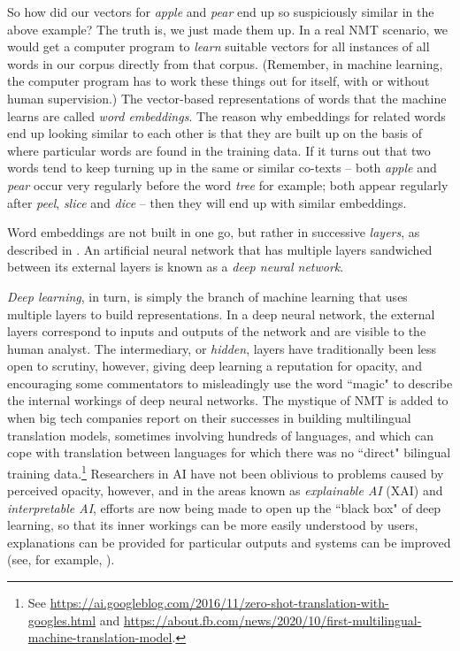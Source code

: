 \documentclass[output=paper]{langscibook}
\begin{document}
So how did our vectors for \textit{apple} and \textit{pear} end up so suspiciously similar in the above example? The truth is, we just made them up. In a real NMT scenario, we would get a computer program to \textit{learn} suitable vectors for all instances of all words in our corpus directly from that corpus. (Remember, in machine learning, the computer program has to work these things out for itself, with or without human supervision.) The vector-based representations of words that the machine learns are called \textit{word embeddings}. The reason why embeddings for related words end up looking similar to each other is that they are built up on the basis of where particular words are found in the training data. If it turns out that two words tend to keep turning up in the same or similar co-texts -- both \textit{apple} and \textit{pear} occur very regularly before the word \textit{tree} for example; both appear regularly after \textit{peel}, \textit{slice} and \textit{dice} -- then they will end up with similar embeddings. 

Word embeddings are not built in one go, but rather in successive \textit{layers}, as described in . An artificial neural network that has multiple layers sandwiched between its external layers is known as a \textit{deep neural network}.

\textit{Deep learning}, in turn, is simply the branch of machine learning that uses multiple layers to build representations. In a deep neural network, the external layers correspond to inputs and outputs of the network and are visible to the human analyst. The intermediary, or \textit{hidden}, layers have traditionally been less open to scrutiny, however, giving deep learning a reputation for opacity, and encouraging some commentators to misleadingly use the word “magic" to describe the internal workings of deep neural networks. The mystique of NMT is added to when big tech companies report on their successes in building multilingual translation models, sometimes involving hundreds of languages, and which can cope with translation between languages for which there was no “direct" bilingual training data.\footnote{See \url{https://ai.googleblog.com/2016/11/zero-shot-translation-with-googles.html} and \url{https://about.fb.com/news/2020/10/first-multilingual-machine-translation-model}.} Researchers in AI have not been oblivious to problems caused by perceived opacity, however, and in the areas known as \textit{explainable AI} (XAI) and \textit{interpretable AI}, efforts are now being made to open up the “black box" of deep learning, so that its inner workings can be more easily understood by users, explanations can be provided for particular outputs and systems can  be improved (see, for example, \citet{Vashishth2019}).
\end{document}
